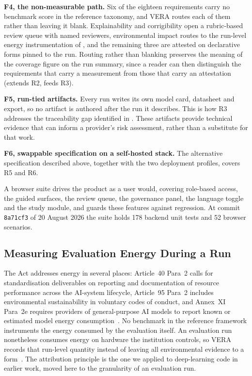 \documentclass[10pt,conference]{IEEEtran}
\begin{document}
\textbf{F4, the non-measurable path.}
Six of the eighteen requirements carry no benchmark score in the reference taxonomy, and VERA routes each of them rather than leaving it blank.
Explainability and corrigibility open a rubric-based review queue with named reviewers, environmental impact routes to the run-level energy instrumentation of , and the remaining three are attested on declarative forms pinned to the run.
Routing rather than blanking preserves the meaning of the coverage figure on the run summary, since a reader can then distinguish the requirements that carry a measurement from those that carry an attestation (extends R2, feeds R3).

\textbf{F5, run-tied artifacts.}
Every run writes its own model card, datasheet and export, so no artifact is authored after the run it describes.
This is how R3 addresses the traceability gap identified in .
These artifacts provide technical evidence that can inform a provider's risk assessment, rather than a substitute for that work.

\textbf{F6, swappable specification on a self-hosted stack.}
The alternative specification described above, together with the two deployment profiles, covers R5 and R6.

A browser suite drives the product as a user would, covering role-based access, the guided surfaces, the review queue, the governance panel, the language toggle and the study module, and guards these features against regression.
At commit \texttt{8a71cf3} of 20 August 2026 the suite holds 178 backend unit tests and 52 browser scenarios.

\subsection{Measuring Evaluation Energy During a Run}
\label{sec:energy}
The Act addresses energy in several places: Article~40 Para~2 calls for standardisation deliverables on reporting and documentation of resource performance across the AI-system lifecycle, Article~95 Para~2 includes environmental sustainability in voluntary codes of conduct, and Annex~XI Para~2e requires providers of general-purpose AI models to report known or estimated model energy consumption~\cite{euaiact2024}.
No benchmark in the reference framework instruments the energy consumed by the evaluation itself.
An evaluation run nonetheless consumes energy on hardware the institution controls, so VERA records that run-level quantity instead of leaving all environmental evidence to a form~\cite{guldimann2024complai}.
The attribution principle is the one we applied to deep-learning code in earlier work, moved here to the granularity of an evaluation run.
\end{document}
